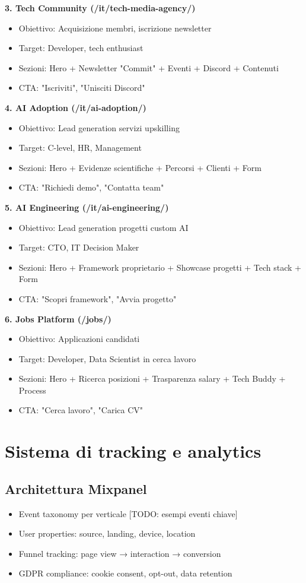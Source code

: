 \textbf{3. Tech Community (/it/tech-media-agency/)}
\begin{itemize}
  \item Obiettivo: Acquisizione membri, iscrizione newsletter
  \item Target: Developer, tech enthusiast
  \item Sezioni: Hero + Newsletter "Commit" + Eventi + Discord + Contenuti
  \item CTA: "Iscriviti", "Unisciti Discord"
\end{itemize}

\textbf{4. AI Adoption (/it/ai-adoption/)}
\begin{itemize}
  \item Obiettivo: Lead generation servizi upskilling
  \item Target: C-level, HR, Management
  \item Sezioni: Hero + Evidenze scientifiche + Percorsi + Clienti + Form
  \item CTA: "Richiedi demo", "Contatta team"
\end{itemize}

\textbf{5. AI Engineering (/it/ai-engineering/)}
\begin{itemize}
  \item Obiettivo: Lead generation progetti custom AI
  \item Target: CTO, IT Decision Maker
  \item Sezioni: Hero + Framework proprietario + Showcase progetti + Tech stack + Form
  \item CTA: "Scopri framework", "Avvia progetto"
\end{itemize}

\textbf{6. Jobs Platform (/jobs/)}
\begin{itemize}
  \item Obiettivo: Applicazioni candidati
  \item Target: Developer, Data Scientist in cerca lavoro
  \item Sezioni: Hero + Ricerca posizioni + Trasparenza salary + Tech Buddy + Process
  \item CTA: "Cerca lavoro", "Carica CV"
\end{itemize}

\section{Sistema di tracking e analytics}
\subsection{Architettura Mixpanel}
\begin{itemize}
  \item Event taxonomy per verticale [TODO: esempi eventi chiave]
  \item User properties: source, landing, device, location
  \item Funnel tracking: page view → interaction → conversion
  \item GDPR compliance: cookie consent, opt-out, data retention
\end{itemize}

